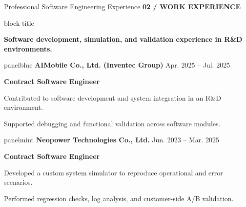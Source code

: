 \documentclass[aspectratio=169,10pt]{beamer}
\newcommand{\smalllabel}[1]{{\scriptsize\bfseries\color{Accent}\MakeUppercase{#1}}}
\newcommand{\takeaway}[1]{%
  \begin{beamercolorbox}[rounded=true,sep=0.15cm,wd=\linewidth]{block title}%
    \strut\textbf{#1}\strut
  \end{beamercolorbox}%
}
\begin{document}
\begin{frame}{Professional Software Engineering Experience}
  \vspace{0.04cm}
  \smalllabel{02 / Work Experience}\par\vspace{0.10cm}
  \takeaway{Software development, simulation, and validation experience in R\&D environments.}
  \vfill

  \begin{beamercolorbox}[rounded=true,sep=0.19cm,wd=\linewidth]{panelblue}
    {\normalsize\bfseries\color{Ink}AIMobile Co., Ltd. (Inventec Group)}\hfill
    {\scriptsize\color{Muted}Apr. 2025 -- Jul. 2025}\par
    \vspace{0.07cm}
    {\small\bfseries\color{AccentBlue}Contract Software Engineer}\par
    \vspace{0.14cm}
    {\small\color{Ink}Contributed to software development and system integration in an R\&D environment.}\par
    \vspace{0.08cm}
    {\small\color{Ink}Supported debugging and functional validation across software modules.}\par
  \end{beamercolorbox}

  \vfill
  \begin{beamercolorbox}[rounded=true,sep=0.19cm,wd=\linewidth]{panelmint}
    {\normalsize\bfseries\color{Ink}Neopower Technologies Co., Ltd.}\hfill
    {\scriptsize\color{Muted}Jun. 2023 -- Mar. 2025}\par
    \vspace{0.07cm}
    {\small\bfseries\color{Accent}Contract Software Engineer}\par
    \vspace{0.14cm}
    {\small\color{Ink}Developed a custom system simulator to reproduce operational and error scenarios.}\par
    \vspace{0.08cm}
    {\small\color{Ink}Performed regression checks, log analysis, and customer-side A/B validation.}\par
  \end{beamercolorbox}
  \vfill
\end{frame}
\end{document}
